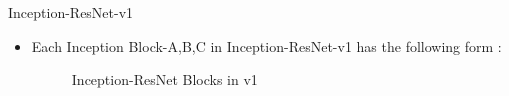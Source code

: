 \documentclass{beamer}
\begin{document}
\begin{frame}{Inception-ResNet-v1}
	\begin{itemize}
		\item Each Inception Block-A,B,C in Inception-ResNet-v1 has the following form :
		\vspace{10pt}
		\begin{figure}[h]		
			\centering
			\quad
			\quad
			\caption{Inception-ResNet Blocks in v1}
			\label{Inception-ResNet Blocks v1}
		\end{figure}
	\end{itemize}
\end{frame}
\end{document}
